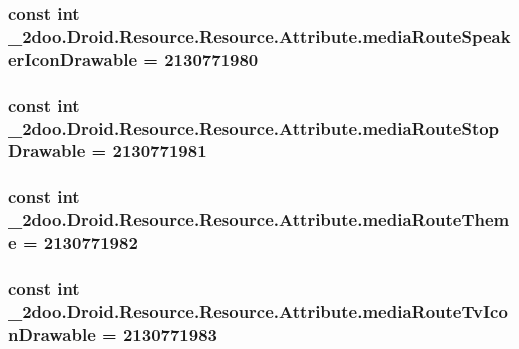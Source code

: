\hypertarget{class__2doo_1_1_droid_1_1_resource_1_1_attribute_f43e487b55dcd2842330b5e2ecb6c47f}{
\subsubsection[{mediaRouteSpeakerIconDrawable}]{\setlength{\rightskip}{0pt plus 5cm}const int \_\-2doo.Droid.Resource.Resource.Attribute.mediaRouteSpeakerIconDrawable = 2130771980}}
\label{class__2doo_1_1_droid_1_1_resource_1_1_attribute_f43e487b55dcd2842330b5e2ecb6c47f}


\hypertarget{class__2doo_1_1_droid_1_1_resource_1_1_attribute_4d53c8cc1068401f8faa49c561e8e1ac}{
\subsubsection[{mediaRouteStopDrawable}]{\setlength{\rightskip}{0pt plus 5cm}const int \_\-2doo.Droid.Resource.Resource.Attribute.mediaRouteStopDrawable = 2130771981}}
\label{class__2doo_1_1_droid_1_1_resource_1_1_attribute_4d53c8cc1068401f8faa49c561e8e1ac}


\hypertarget{class__2doo_1_1_droid_1_1_resource_1_1_attribute_d0e0110fb63b8b11436dafaf94e92eb7}{
\subsubsection[{mediaRouteTheme}]{\setlength{\rightskip}{0pt plus 5cm}const int \_\-2doo.Droid.Resource.Resource.Attribute.mediaRouteTheme = 2130771982}}
\label{class__2doo_1_1_droid_1_1_resource_1_1_attribute_d0e0110fb63b8b11436dafaf94e92eb7}


\hypertarget{class__2doo_1_1_droid_1_1_resource_1_1_attribute_0b492694d39b79646668411d5081f696}{
\subsubsection[{mediaRouteTvIconDrawable}]{\setlength{\rightskip}{0pt plus 5cm}const int \_\-2doo.Droid.Resource.Resource.Attribute.mediaRouteTvIconDrawable = 2130771983}}
\label{class__2doo_1_1_droid_1_1_resource_1_1_attribute_0b492694d39b79646668411d5081f696}


